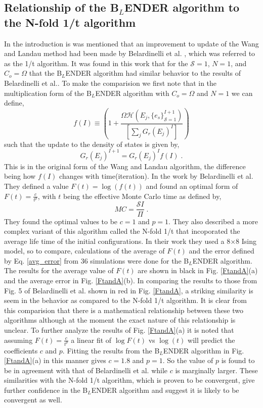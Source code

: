 \documentclass[aps,pre,reprint,superscriptaddress,showkeys]{revtex4-1}
\begin{document}
\subsection{Relationship of the B$_L$ENDER algorithm to the N-fold 1/t algorithm}
In the introduction is was mentioned that an improvement to update of the Wang and Landau method had been made by Belardinelli et al. \cite{saturation}, which was referred to as the 1/t algorithm. It was found in this work that for the $\mathcal{S}=1$, $N=1$, and $C_{o}=\Omega$ that the B$_L$ENDER algorithm had similar behavior to the results of Belardinelli et al.. To make the comparision we first note that in the multiplication form of the B$_L$ENDER algorithm with $C_o = \Omega$ and $N=1$ we can define, 
\begin{equation}
f(I) \equiv ( 1 +  \frac{\Omega \mathcal{H}(E_j,\{e_s\}_{\mathcal{S}=1}^{I+1}) }{ [\sum_j G_{r}(E_j)^{I}] } )  
\label{fequiv}
\end{equation}
such that the update to the density of states is given by,
\begin{equation}
G_{r}(E_j)^{I+1} = G_{r}(E_j)^{I}f(I)\;.
\label{orignialform}
\end{equation}
This is in the original form of the Wang and Landau algorithm, the difference being how $f(I)$ changes with time(iteration). In the work by Belardinelli et al. They defined a value $F(t) = \log(f(t))$  and found an optimal form of $F(t) = \frac{c}{t^p}$, with $t$ being the effective Monte Carlo time as defined by,
\begin{equation}
MC = \frac{\mathcal{S}I}{\Pi} \;.
\label{mcstep}
\end{equation} 
 They found the optimal values to be $c=1$ and $p=1$. They also described a more complex variant of this algorithm called the N-fold 1/t  that incoporated the average life time of the initial configurations. In their work they used a 8$\times$8 Ising model, so to compare, calculations of the average of $F(t)$ and the error defined by Eq. \ref{avg_error} from 36 simulations were done for the B$_L$ENDER algorithm. The results for the average value of $F(t)$ are shown in black in Fig. \ref{FtandA}(a) and the average error in Fig. \ref{FtandA}(b). In comparing the results to those from Fig. 5 of Belardinelli et al. \cite{saturation} shown in red in Fig. \ref{FtandA}, a striking similarity is seem in the behavior as compared to the N-fold 1/t algorithm. It is clear from this comparision that there is a mathematical relationship between these two algorithms although at the moment the exact nature of this relationship is unclear.  To further analyze the results of  Fig. \ref{FtandA}(a) it is noted that assuming $F(t) = \frac{c}{t^p}$  a linear fit of  $\log F(t)$ vs $\log(t)$ will predict the coefficients $c$ and $p$. Fitting the results from the B$_L$ENDER algorithm in Fig. \ref{FtandA}(a) in this manner gives $c=1.8$ and $p=1$. So the value of $p$ is found to be in agreement with that of Belardinelli et al. while $c$ is marginally larger. These similarities with the N-fold 1/t algorithm, which is proven to be convergent, give further confidence in the B$_L$ENDER algorithm and suggest it is likely to be convergent as well. 
\end{document}

